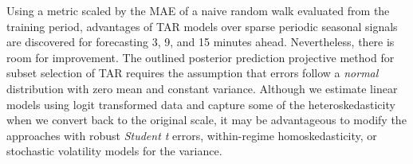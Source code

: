 Using a metric scaled by the MAE of a naive random walk evaluated from the training period, advantages of TAR models over sparse periodic seasonal signals are discovered for forecasting 3, 9, and 15 minutes ahead. Nevertheless, there is room for improvement. The outlined posterior prediction projective method for subset selection of TAR requires the assumption that errors follow a \textit{normal} distribution with zero mean and constant variance. Although we estimate linear models using logit transformed data and capture some of the heteroskedasticity when we convert back to the original scale, it may be advantageous to modify the approaches with robust \textit{Student t} errors, within-regime homoskedasticity, or stochastic volatility models for the variance. 























